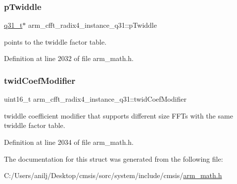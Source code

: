 \subsubsection{\texorpdfstring{p\+Twiddle}{pTwiddle}}
{\footnotesize\ttfamily \hyperlink{arm__math_8h_adc89a3547f5324b7b3b95adec3806bc0}{q31\+\_\+t}$\ast$ arm\+\_\+cfft\+\_\+radix4\+\_\+instance\+\_\+q31\+::p\+Twiddle}

points to the twiddle factor table. 

Definition at line 2032 of file arm\+\_\+math.\+h.

\mbox{\label{structarm__cfft__radix4__instance__q31_a8cf8187b8232815cf17ee82bf572ecf9}} 
\subsubsection{\texorpdfstring{twid\+Coef\+Modifier}{twidCoefModifier}}
{\footnotesize\ttfamily uint16\+\_\+t arm\+\_\+cfft\+\_\+radix4\+\_\+instance\+\_\+q31\+::twid\+Coef\+Modifier}

twiddle coefficient modifier that supports different size F\+F\+Ts with the same twiddle factor table. 

Definition at line 2034 of file arm\+\_\+math.\+h.



The documentation for this struct was generated from the following file\+:\begin{DoxyCompactItemize}
\item 
C\+:/\+Users/anilj/\+Desktop/cmsis/sorc/system/include/cmsis/\hyperlink{arm__math_8h}{arm\+\_\+math.\+h}\end{DoxyCompactItemize}
